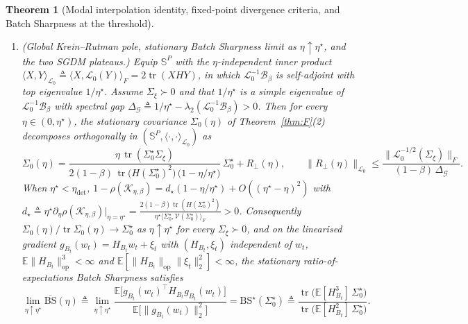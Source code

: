 \documentclass[11pt]{article}
\newtheorem{theorem}{Theorem}
\theoremstyle{remark}
\newcommand{\E}{\mathbb{E}}
\newcommand{\tr}{\operatorname{tr}}
\begin{document}
\begin{theorem}[Modal interpolation identity, fixed-point divergence criteria, and Batch Sharpness at the threshold]
\begin{enumerate}
\item \emph{(Global Krein--Rutman pole, stationary Batch Sharpness limit as $\eta\uparrow\eta^\star$, and the two SGDM plateaus.)} Equip $\mathbb S^P$ with the $\eta$-independent inner product $\langle X,Y\rangle_{\mathcal L_0}\triangleq\langle X,\mathcal L_0(Y)\rangle_F=2\tr(XHY)$, in which $\mathcal L_0^{-1}\mathcal B_\beta$ is self-adjoint with top eigenvalue $1/\eta^\star$. Assume $\Sigma_\xi\succ0$ and that $1/\eta^\star$ is a simple eigenvalue of $\mathcal L_0^{-1}\mathcal B_\beta$ with spectral gap $\Delta_{\mathcal G}\triangleq 1/\eta^\star-\lambda_2(\mathcal L_0^{-1}\mathcal B_\beta)>0$. Then for every $\eta\in(0,\eta^\star)$, the stationary covariance $\Sigma_0(\eta)$ of Theorem~\ref{thm:F}(2) decomposes orthogonally in $(\mathbb S^P,\langle\cdot,\cdot\rangle_{\mathcal L_0})$ as
\begin{equation}\label{eq:sigma0-pole}
\Sigma_0(\eta)=\frac{\eta\,\tr(\Sigma_0^\star\Sigma_\xi)}{2(1-\beta)\,\tr\big(H(\Sigma_0^\star)^2\big)\,\big(1-\eta/\eta^\star\big)}\,\Sigma_0^\star+R_\perp(\eta),\qquad
\|R_\perp(\eta)\|_{\mathcal L_0}\le\frac{\|\mathcal L_0^{-1/2}(\Sigma_\xi)\|_F}{(1-\beta)\,\Delta_{\mathcal G}}.
\end{equation}
When $\eta^\star<\eta_{\mathrm{det}}$, $1-\rho(\mathcal K_{\eta,\beta})=d_\star(1-\eta/\eta^\star)+O((\eta^\star-\eta)^2)$ with $d_\star\triangleq\eta^\star\partial_\eta\rho(\mathcal K_{\eta,\beta})\big|_{\eta=\eta^\star}=\frac{2(1-\beta)\tr(H(\Sigma_0^\star)^2)}{\eta^\star\langle\Sigma_0^\star,\mathcal V(\Sigma_0^\star)\rangle_F}>0$. Consequently $\Sigma_0(\eta)/\tr\Sigma_0(\eta)\to\Sigma_0^\star$ as $\eta\uparrow\eta^\star$ for every $\Sigma_\xi\succ0$, and on the linearised gradient $g_{B_t}(w_t)=H_{B_t}w_t+\xi_t$ with $(H_{B_t},\xi_t)$ independent of $w_t$, $\E\|H_{B_t}\|_{\mathrm{op}}^3<\infty$ and $\E[\|H_{B_t}\|_{\mathrm{op}}\|\xi_t\|_2^2]<\infty$, the stationary ratio-of-expectations Batch Sharpness satisfies
\begin{equation}\label{eq:bs-star-limit}
\lim_{\eta\uparrow\eta^\star}\overline{\mathrm{BS}}(\eta)\triangleq\lim_{\eta\uparrow\eta^\star}\frac{\E\big[g_{B_t}(w_t)^\top H_{B_t}g_{B_t}(w_t)\big]}{\E\big[\|g_{B_t}(w_t)\|_2^2\big]}=\mathrm{BS}^\star(\Sigma_0^\star)\triangleq\frac{\tr\big(\E[H_{B_t}^3]\,\Sigma_0^\star\big)}{\tr\big(\E[H_{B_t}^2]\,\Sigma_0^\star\big)}.
\end{equation}

\end{enumerate}
\end{theorem}
\end{document}
